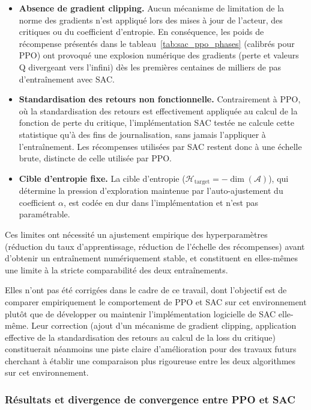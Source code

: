 \begin{itemize}
    \item \textbf{Absence de gradient clipping.} Aucun mécanisme de limitation de la norme des gradients n'est appliqué lors des mises à jour de l'acteur, des critiques ou du coefficient d'entropie. En conséquence, les poids de récompense présentés dans le tableau~\ref{tab:sac_ppo_phases} (calibrés pour PPO) ont provoqué une explosion numérique des gradients (perte et valeurs Q divergeant vers l'infini) dès les premières centaines de milliers de pas d'entraînement avec SAC.
    \item \textbf{Standardisation des retours non fonctionnelle.} Contrairement à PPO, où la standardisation des retours est effectivement appliquée au calcul de la fonction de perte du critique, l'implémentation SAC testée ne calcule cette statistique qu'à des fins de journalisation, sans jamais l'appliquer à l'entraînement. Les récompenses utilisées par SAC restent donc à une échelle brute, distincte de celle utilisée par PPO.
    \item \textbf{Cible d'entropie fixe.} La cible d'entropie ($\mathcal{H}_{\text{target}} = -\dim(\mathcal{A})$), qui détermine la pression d'exploration maintenue par l'auto-ajustement du coefficient $\alpha$, est codée en dur dans l'implémentation et n'est pas paramétrable.
\end{itemize}

Ces limites ont nécessité un ajustement empirique des hyperparamètres (réduction du taux d'apprentissage, réduction de l'échelle des récompenses) avant d'obtenir un entraînement numériquement stable, et constituent en elles-mêmes une limite à la stricte comparabilité des deux entraînements.

Elles n'ont pas été corrigées dans le cadre de ce travail, dont l'objectif est de comparer empiriquement le comportement de PPO et SAC sur cet environnement plutôt que de développer ou maintenir l'implémentation logicielle de SAC elle-même. Leur correction (ajout d'un mécanisme de gradient clipping, application effective de la standardisation des retours au calcul de la loss du critique) constituerait néanmoins une piste claire d'amélioration pour des travaux futurs cherchant à établir une comparaison plus rigoureuse entre les deux algorithmes sur cet environnement.


\subsubsection{Résultats et divergence de convergence entre PPO et SAC}

